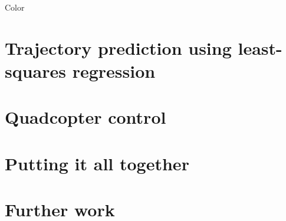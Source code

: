 \documentclass{article}
\begin{document}
Color

\section{Trajectory prediction using least-squares regression}

\section{Quadcopter control}

\section{Putting it all together}

\section{Further work}
\end{document}

